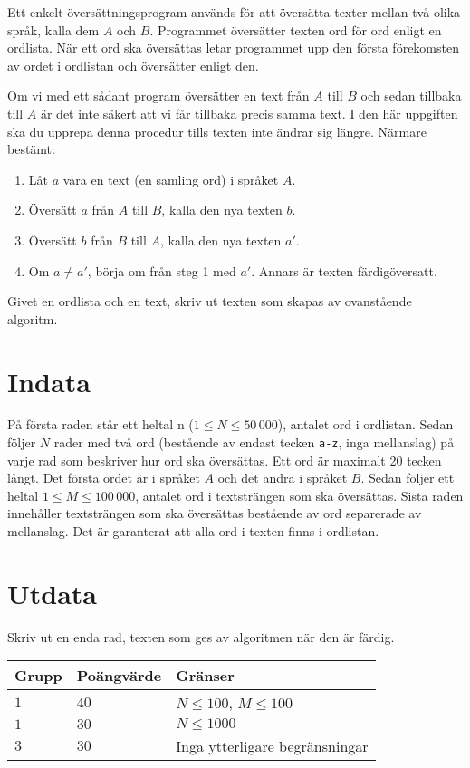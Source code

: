 Ett enkelt översättningsprogram används för att översätta texter mellan två
olika språk, kalla dem $A$ och $B$. Programmet översätter texten ord för ord enligt
en ordlista. När ett ord ska översättas letar programmet upp den första
förekomsten av ordet i ordlistan och översätter enligt den. 

Om vi med ett sådant program översätter en text från $A$ till $B$ och sedan tillbaka till $A$ är det inte säkert att vi får tillbaka precis samma text. I den här uppgiften ska du upprepa denna procedur tills texten inte ändrar sig längre. Närmare bestämt:
\begin{enumerate}
    \item Låt $a$ vara en text (en samling ord) i språket $A$.
    \item Översätt $a$ från $A$ till $B$, kalla den nya texten $b$.
    \item Översätt $b$ från $B$ till $A$, kalla den nya texten $a'$.
    \item Om $a \not = a'$, börja om från steg 1 med $a'$. Annars är texten färdigöversatt.
\end{enumerate}

Givet en ordlista och en text, skriv ut texten som skapas av ovanstående algoritm.

\section*{Indata}
På första raden står ett heltal n ($1 \leq N \leq 50\,000$), antalet ord i ordlistan.
Sedan följer $N$ rader med två ord (bestående av endast tecken \texttt{a-z},
inga mellanslag) på varje rad som beskriver hur ord ska översättas. Ett ord är maximalt 20 tecken långt.
Det första ordet är i språket $A$ och det andra i språket $B$.  Sedan följer ett heltal $1 \leq M \leq 100\,000$,
antalet ord i textsträngen som ska översättas. Sista raden innehåller textsträngen som ska översättas
bestående av ord separerade av mellanslag. Det är garanterat
att alla ord i texten finns i ordlistan.

\section*{Utdata}
Skriv ut en enda rad, texten som ges av algoritmen när den är färdig.

\noindent
\begin{tabular}{| l | l | l |}
  \hline
  Grupp & Poängvärde & Gränser \\ \hline
  $1$   & $40$       & $N \leq 100$, $M \leq 100$ \\ \hline
  $1$   & $30$       & $N \leq 1000$ \\ \hline
  $3$   & $30$       & Inga ytterligare begränsningar \\ \hline
\end{tabular}


